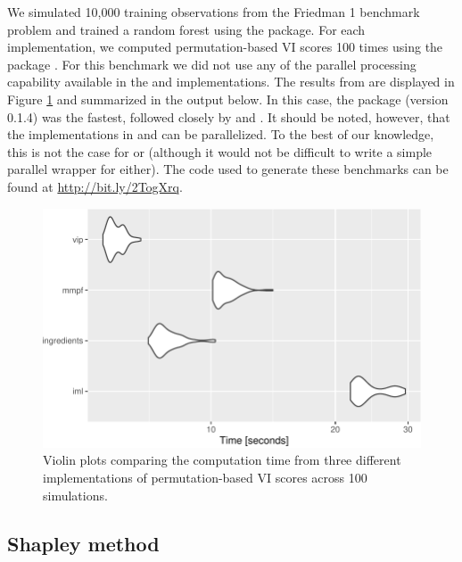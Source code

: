 We simulated 10,000 training observations from the Friedman 1 benchmark
problem and trained a random forest using the  package. For
each implementation, we computed permutation-based VI scores 100 times
using the  package \citep{R-microbenchmark}. For
this benchmark we did not use any of the parallel processing capability
available in the  and  implementations. The results
from  are displayed in Figure \ref{fig:benchmark}
and summarized in the output below. In this case, the  package
(version 0.1.4) was the fastest, followed closely by 
and . It should be noted, however, that the implementations in
 and  can be parallelized. To the best of our
knowledge, this is not the case for  or 
(although it would not be difficult to write a simple parallel wrapper
for either). The code used to generate these benchmarks can be found at
\url{http://bit.ly/2TogXrq}.

\begin{Schunk}
\begin{figure}[!htb]

{\centering \includegraphics[width=0.7\linewidth]{greenwell-boehmke_files/figure-latex/benchmark-1} 

}

\caption[Violin plots comparing the computation time from three different implementations of permutation-based VI scores across 100 simulations]{Violin plots comparing the computation time from three different implementations of permutation-based VI scores across 100 simulations.}\label{fig:benchmark}
\end{figure}
\end{Schunk}

\subsection{Shapley method}

